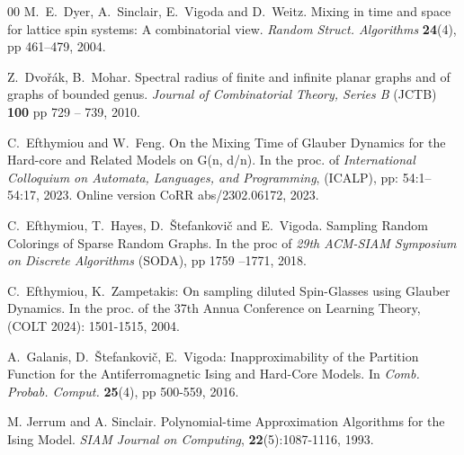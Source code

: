 \documentclass[11pt,reqno]{amsart}
\numberwithin{equation}{section}
\newcommand{\blue}[1]{{\color{blue}#1}}
\renewcommand{\blue}[1]{#1}
\begin{document}
\begin{thebibliography}{00}
M.~E.~Dyer, A.~Sinclair, E.~Vigoda and D.~Weitz.
Mixing in time and space for lattice spin systems: A combinatorial view. {\em Random Struct. Algorithms} {\bf 24}(4), pp 461--479,  2004. 


Z.~Dvo\v r\'ak, B.~Mohar.
Spectral radius of finite and infinite planar graphs and of graphs of bounded genus. 
{\em Journal of Combinatorial Theory, Series B} (JCTB) {\bf 100} pp 729 -- 739, 2010. 



%


C.~Efthymiou and W.~Feng.
On the Mixing Time of Glauber Dynamics for the Hard-core and Related Models on G(n, d/n). 
In the proc. of {\em International Colloquium on Automata, Languages, and Programming}, (ICALP), 
pp: 54:1--54:17, 2023. Online version CoRR abs/2302.06172, 2023.


 C.~Efthymiou, T.~Hayes, D.~\v Stefankovi\v c and E.~Vigoda.
{Sampling Random Colorings of Sparse Random Graphs.}
In the proc of {\em 29th ACM-SIAM Symposium on Discrete Algorithms} (SODA), pp 1759 --1771, 2018.

C.~Efthymiou, K.~Zampetakis:
On sampling diluted Spin-Glasses using Glauber Dynamics. 
In the proc. of the 37th Annua Conference on Learning Theory, (COLT 2024): 1501-1515, 2004.



A.~Galanis, D.~\v Stefankovi\v c, E.~Vigoda:
Inapproximability of the Partition Function for the Antiferromagnetic Ising and Hard-Core Models. 
In {\em Comb. Probab. Comput.} {\bf 25}(4), pp 500-559, 2016.



M. Jerrum and A. Sinclair. Polynomial-time Approximation Algorithms for the Ising Model. {\em SIAM
Journal on Computing}, {\bf 22}(5):1087-1116, 1993.








\end{thebibliography}
\end{document}
